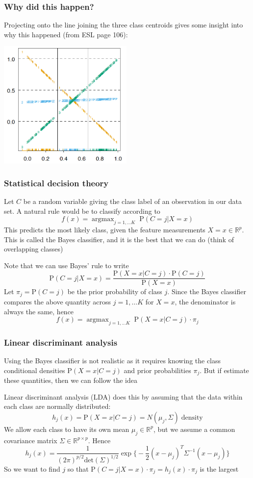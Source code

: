 \documentclass[mathserif]{beamer}
\newcommand{\argmax}{\mathop{\mathrm{argmax}}}
\def\P{\mathrm{P}}
\def\R{\mathds{R}}
\def\red{\color[rgb]{0.8,0,0}}
\begin{document}
\begin{frame}
\frametitle{Why did this happen?}
Projecting onto the line joining the three class centroids gives some insight into 
why this happened (from ESL page 106):
\begin{center}
\includegraphics[width=2.6in]{why.png}
\end{center}
\end{frame}

\begin{frame}
\frametitle{Statistical decision theory}
\smallskip
\smallskip
Let $C$ be a random variable giving the class label of an 
observation in our data set. A natural rule would be to classify 
according to 
$$f(x) = \argmax_{j=1,\ldots K} \; \P(C=j|X=x)$$
This predicts the most likely class, given the feature measurements $X=x \in \R^p$.
This is called the {\red Bayes classifier}, and it is the best that we can do (think 
of overlapping classes)

\bigskip
Note that we can use Bayes' rule to write
$$\P(C=j|X=x) = \frac{\P(X=x|C=j) \cdot \P(C=j)}
{\P(X=x)}$$
Let $\pi_j = \P(C=j)$ be the {\red prior probability} of class $j$.
Since the Bayes classifier compares the above quantity across $j=1,\ldots K$ 
for $X=x$, the denominator is always the same, hence
$$f(x) = \argmax_{j=1,\ldots K}\; \P(X=x|C=j) \cdot \pi_j$$
\end{frame}

\begin{frame}
\frametitle{Linear discriminant analysis}
Using the Bayes classifier is not realistic as it requires knowing the 
class conditional densities $\P(X=x|C=j)$ and prior probabilities $\pi_j$. 
But if estimate these quantities, then we can follow the idea

\bigskip
{\red Linear discriminant analysis} (LDA) does this by assuming that 
the data within each class are normally distributed: 
$$h_j(x) = \P(X=x|C=j) = N(\mu_j, \Sigma) \;\mathrm{density} $$
We allow each class to have {\red its own mean} $\mu_j \in \R^p$, but 
we assume a {\red common covariance matrix} $\Sigma \in \R^{p \times p}$.
Hence
$$h_j(x) = \frac{1}{(2\pi)^{p/2} \mathrm{det}(\Sigma)^{1/2}}
\exp\Big\{-\frac{1}{2}(x-\mu_j)^T \Sigma^{-1} (x-\mu_j)\Big\}$$
So we want to find $j$ so that $\P(C=j|X=x)\cdot\pi_j =
h_j(x)\cdot\pi_j$ is the largest

\end{frame}
\end{document}
